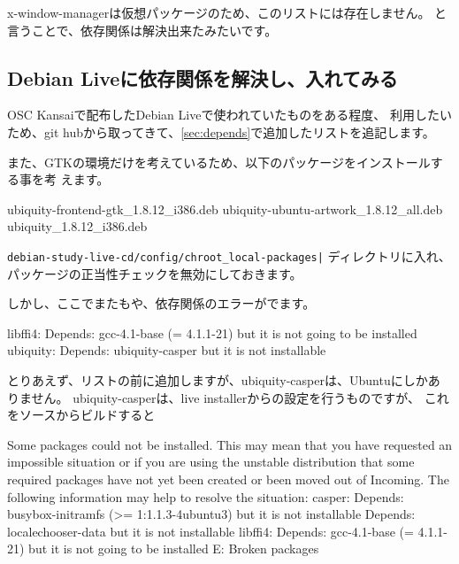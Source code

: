 \documentclass[mingoth,a4paper]{jsarticle}
\begin{document}
x-window-managerは仮想パッケージのため、このリストには存在しません。
と言うことで、依存関係は解決出来たみたいです。

\subsection{Debian Liveに依存関係を解決し、入れてみる}

OSC Kansaiで配布したDebian Liveで使われていたものをある程度、
利用したいため、git hubから取ってきて、\ref{sec:depends}で追加したリストを追記します。

\begin{commandline}
\end{commandline}

また、GTKの環境だけを考えているため、以下のパッケージをインストールする事を考
えます。

\begin{commandline}
ubiquity-frontend-gtk_1.8.12_i386.deb
ubiquity-ubuntu-artwork_1.8.12_all.deb
ubiquity_1.8.12_i386.deb 
\end{commandline}

{\tt debian-study-live-cd/config/chroot\_local-packages|}
ディレクトリに入れ、パッケージの正当性チェックを無効にしておきます。

\begin{commandline}
\end{commandline}

しかし、ここでまたもや、依存関係のエラーがでます。

\begin{commandline}
  libffi4: Depends: gcc-4.1-base (= 4.1.1-21) but it is not going to be installed
  ubiquity: Depends: ubiquity-casper but it is not installable 
\end{commandline}

とりあえず、リストの前に追加しますが、ubiquity-casperは、Ubuntuにしかあ
りません。
ubiquity-casperは、live installerからの設定を行うものですが、
これをソースからビルドすると

\begin{commandline}
Some packages could not be installed. This may mean that you have
requested an impossible situation or if you are using the unstable
distribution that some required packages have not yet been created
or been moved out of Incoming.
The following information may help to resolve the situation:
 casper: Depends: busybox-initramfs (>= 1:1.1.3-4ubuntu3) but it is not installable
         Depends: localechooser-data but it is not installable
 libffi4: Depends: gcc-4.1-base (= 4.1.1-21) but it is not going to be installed
E: Broken packages
\end{commandline}
\end{document}

